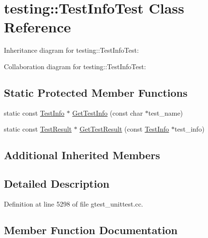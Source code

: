 \hypertarget{classtesting_1_1_test_info_test}{}\section{testing\+:\+:Test\+Info\+Test Class Reference}
\label{classtesting_1_1_test_info_test}


Inheritance diagram for testing\+:\+:Test\+Info\+Test\+:


Collaboration diagram for testing\+:\+:Test\+Info\+Test\+:
\subsection*{Static Protected Member Functions}
\begin{DoxyCompactItemize}
\item 
static const \hyperlink{classtesting_1_1_test_info}{Test\+Info} $\ast$ \hyperlink{classtesting_1_1_test_info_test_a4140c1302bf53c7f1375a23923624f04}{Get\+Test\+Info} (const char $\ast$test\+\_\+name)
\item 
static const \hyperlink{classtesting_1_1_test_result}{Test\+Result} $\ast$ \hyperlink{classtesting_1_1_test_info_test_a154b3679b1aa00ad037ce46eb60d18c3}{Get\+Test\+Result} (const \hyperlink{classtesting_1_1_test_info}{Test\+Info} $\ast$test\+\_\+info)
\end{DoxyCompactItemize}
\subsection*{Additional Inherited Members}


\subsection{Detailed Description}


Definition at line 5298 of file gtest\+\_\+unittest.\+cc.



\subsection{Member Function Documentation}
